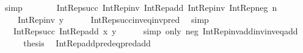\begin{isabellebody}
\ simp\isanewline
\ \ \isamarkupfalse%
\ \isamarkupfalse%
\ {\isachardoublequoteopen}{\isachardot}{\kern0pt}{\isachardot}{\kern0pt}{\isachardot}{\kern0pt}\ {\isacharequal}{\kern0pt}\ Int{\isacharunderscore}{\kern0pt}Rep{\isacharunderscore}{\kern0pt}succ\ {\isacharparenleft}{\kern0pt}Int{\isacharunderscore}{\kern0pt}Rep{\isacharunderscore}{\kern0pt}inv\ {\isacharparenleft}{\kern0pt}Int{\isacharunderscore}{\kern0pt}Rep{\isacharunderscore}{\kern0pt}add\ {\isacharparenleft}{\kern0pt}Int{\isacharunderscore}{\kern0pt}Rep{\isacharunderscore}{\kern0pt}inv\ {\isacharparenleft}{\kern0pt}Int{\isacharunderscore}{\kern0pt}Rep{\isacharunderscore}{\kern0pt}neg\ n{\isacharparenright}{\kern0pt}{\isacharparenright}{\kern0pt}\isanewline
\ \ \ \ {\isacharparenleft}{\kern0pt}Int{\isacharunderscore}{\kern0pt}Rep{\isacharunderscore}{\kern0pt}inv\ y{\isacharparenright}{\kern0pt}{\isacharparenright}{\kern0pt}{\isacharparenright}{\kern0pt}{\isachardoublequoteclose}\isanewline
\ \ \ \ \isamarkupfalse%
\ Int{\isacharunderscore}{\kern0pt}Rep{\isacharunderscore}{\kern0pt}succ{\isacharunderscore}{\kern0pt}inv{\isacharunderscore}{\kern0pt}eq{\isacharunderscore}{\kern0pt}inv{\isacharunderscore}{\kern0pt}pred\ \isamarkupfalse%
\ simp\isanewline
\ \ \isamarkupfalse%
\ \isamarkupfalse%
\ {\isachardoublequoteopen}{\isachardot}{\kern0pt}{\isachardot}{\kern0pt}{\isachardot}{\kern0pt}\ {\isacharequal}{\kern0pt}\ Int{\isacharunderscore}{\kern0pt}Rep{\isacharunderscore}{\kern0pt}succ\ {\isacharparenleft}{\kern0pt}Int{\isacharunderscore}{\kern0pt}Rep{\isacharunderscore}{\kern0pt}add\ x\ y{\isacharparenright}{\kern0pt}{\isachardoublequoteclose}\isanewline
\ \ \ \ \isamarkupfalse%
\ {\isacharparenleft}{\kern0pt}simp\ only{\isacharcolon}{\kern0pt}\ neg\ Int{\isacharunderscore}{\kern0pt}Rep{\isacharunderscore}{\kern0pt}inv{\isacharunderscore}{\kern0pt}add{\isacharunderscore}{\kern0pt}inv{\isacharunderscore}{\kern0pt}inv{\isacharunderscore}{\kern0pt}eq{\isacharunderscore}{\kern0pt}add{\isacharparenright}{\kern0pt}\isanewline
\ \ \isamarkupfalse%
\ \isamarkupfalse%
\ {\isacharquery}{\kern0pt}thesis\ \isacommand{{\isachardot}{\kern0pt}}\isamarkupfalse%
\isanewline
{}\isamarkupfalse%
%
\endisatagproof
{\isafoldproof}%
%
\isadelimproof
\isanewline
%
\endisadelimproof
\isanewline
{}\isamarkupfalse%
\ Int{\isacharunderscore}{\kern0pt}Rep{\isacharunderscore}{\kern0pt}add{\isacharunderscore}{\kern0pt}pred{\isacharunderscore}{\kern0pt}eq{\isacharunderscore}{\kern0pt}pred{\isacharunderscore}{\kern0pt}add{\isacharcolon}{\kern0pt}\isanewline

\end{isabellebody}

